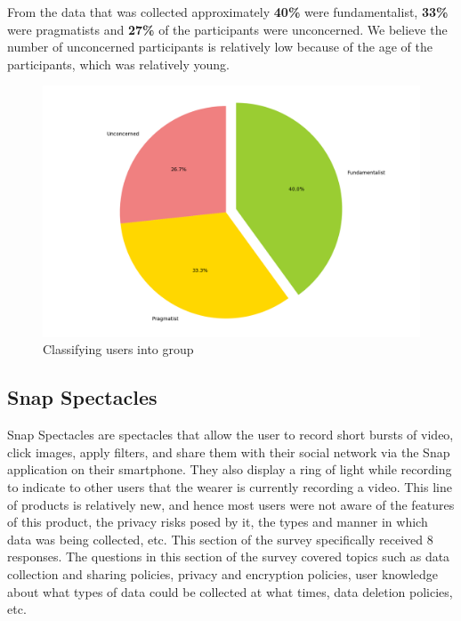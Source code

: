 \documentclass[sigconf]{acmart}
\begin{document}
From the data that was collected approximately \textbf{40\%} were fundamentalist, \textbf{33\%} were pragmatists and \textbf{27\%} of the participants were unconcerned. We believe the number of unconcerned participants is relatively low because of the age of the participants, which was relatively young.

\begin{figure}[h]
  \centering
  \includegraphics[width=\linewidth]{09-chart.png}
  \caption{Classifying users into group}
  \label{fig:responsesSecondSurvey}
\end{figure}


\subsection{Snap Spectacles} \label{snapchatAnalysis}

Snap Spectacles are spectacles that allow the user to record short bursts of video, click images, apply filters, and share them with their social network via the Snap application on their smartphone. They also display a ring of light while recording to indicate to other users that the wearer is currently recording a video. This line of products is relatively new, and hence most users were not aware of the features of this product, the privacy risks posed by it, the types and manner in which data was being collected, etc. This section of the survey specifically received 8 responses. The questions in this section of the survey covered topics such as data collection and sharing policies, privacy and encryption policies, user knowledge about what types of data could be collected at what times, data deletion policies, etc. 
\end{document}
